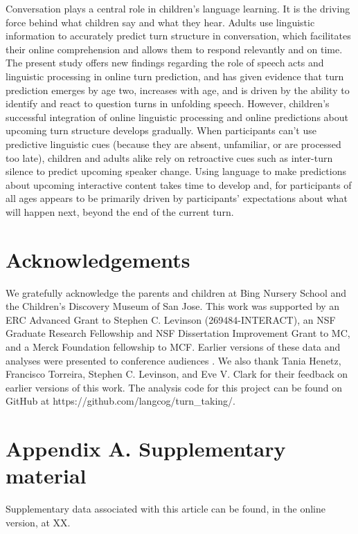 \documentclass[authoryear, 12pt]{elsarticle}
\begin{document}
Conversation plays a central role in children's language learning. It is the driving force behind what children say and what they hear. Adults use linguistic information to accurately predict turn structure in conversation, which facilitates their online comprehension and allows them to respond relevantly and on time. The present study offers new findings regarding the role of speech acts and linguistic processing in online turn prediction, and has given evidence that turn prediction emerges by age two, increases with age, and is driven by the ability to identify and react to question turns in unfolding speech. However, children's successful integration of online linguistic processing and online predictions about upcoming turn structure develops gradually. When participants can't use predictive linguistic cues (because they are absent, unfamiliar, or are processed too late), children and adults alike rely on retroactive cues such as inter-turn silence to predict upcoming speaker change. Using language to make predictions about upcoming interactive content takes time to develop and, for participants of all ages appears to be primarily driven by participants' expectations about what will happen next, beyond the end of the current turn.

\section*{Acknowledgements}

We gratefully acknowledge the parents and children at Bing Nursery School and the Children's Discovery Museum of San Jose. This work was supported by an ERC Advanced Grant to Stephen C. Levinson (269484-INTERACT), an NSF Graduate Research Fellowship and NSF Dissertation Improvement Grant to MC, and a Merck Foundation fellowship to MCF. Earlier versions of these data and analyses were presented to conference audiences \citep{casillas2012, casillas2013}. We also thank Tania Henetz, Francisco Torreira, Stephen C. Levinson, and Eve V. Clark for their feedback on earlier versions of this work. The analysis code for this project can be found on GitHub at https://github.com/langcog/turn\_taking/.

\section*{Appendix A. Supplementary material}

Supplementary data associated with this article can be found, in the online version, at XX.



\clearpage
\end{document}
